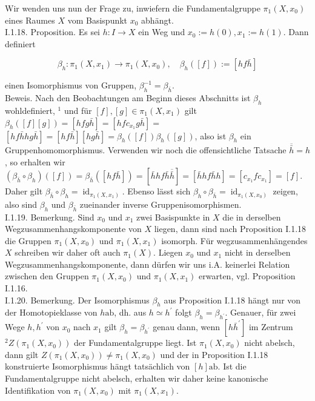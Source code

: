 \documentclass[10pt]{article}
\begin{document}
Wir wenden uns nun der Frage zu, inwiefern die Fundamentalgruppe $\pi_{1}\left(X, x_{0}\right)$ eines Raumes $X$ vom Basispunkt $x_{0}$ abhängt.\\
I.1.18. Proposition. Es sei $h: I \rightarrow X$ ein Weg und $x_{0}:=h(0), x_{1}:=h(1)$. Dann definiert

$$
\beta_{h}: \pi_{1}\left(X, x_{1}\right) \rightarrow \pi_{1}\left(X, x_{0}\right), \quad \beta_{h}([f]):=[h f \bar{h}]
$$

einen Isomorphismus von Gruppen, $\beta_{h}^{-1}=\beta_{\bar{h}}$.\\
Beweis. Nach den Beobachtungen am Beginn dieses Abschnitts ist $\beta_{h}$ wohldefiniert, ${ }^{1}$ und für $[f],[g] \in \pi_{1}\left(X, x_{1}\right)$ gilt $\beta_{h}([f][g])=[h f g \bar{h}]=\left[h f c_{x_{1}} g \bar{h}\right]=$ $[h f \bar{h} h g \bar{h}]=[h f \bar{h}][h g \bar{h}]=\beta_{h}([f]) \beta_{h}([g])$, also ist $\beta_{h}$ ein Gruppenhomomorphismus. Verwenden wir noch die offensichtliche Tatsache $\overline{\bar{h}}=h$, so erhalten wir $\left(\beta_{\bar{h}} \circ \beta_{h}\right)([f])=\beta_{\bar{h}}([h f \bar{h}])=[\bar{h} h f \bar{h} \overline{\bar{h}}]=[\bar{h} h f \bar{h} h]=\left[c_{x_{1}} f c_{x_{1}}\right]=[f]$. Daher gilt $\beta_{\bar{h}} \circ \beta_{h}=\operatorname{id}_{\pi_{1}\left(X, x_{1}\right)}$. Ebenso lässt sich $\beta_{h} \circ \beta_{\bar{h}}=\operatorname{id}_{\pi_{1}\left(X, x_{0}\right)}$ zeigen, also sind $\beta_{h}$ und $\beta_{\bar{h}}$ zueinander inverse Gruppenisomorphismen.\\
I.1.19. Bemerkung. Sind $x_{0}$ und $x_{1}$ zwei Basispunkte in $X$ die in derselben Wegzusammenhangskomponente von $X$ liegen, dann sind nach Proposition I.1.18 die Gruppen $\pi_{1}\left(X, x_{0}\right)$ und $\pi_{1}\left(X, x_{1}\right)$ isomorph. Für wegzusammenhängendes $X$ schreiben wir daher oft auch $\pi_{1}(X)$. Liegen $x_{0}$ und $x_{1}$ nicht in derselben Wegzusammenhangskomponente, dann dürfen wir uns i.A. keinerlei Relation zwischen den Gruppen $\pi_{1}\left(X, x_{0}\right)$ und $\pi_{1}\left(X, x_{1}\right)$ erwarten, vgl. Proposition I.1.16.\\
I.1.20. Bemerkung. Der Isomorphismus $\beta_{h}$ aus Proposition I.1.18 hängt nur von der Homotopieklasse von $h \mathrm{ab}$, dh. aus $h \simeq h^{\prime}$ folgt $\beta_{h}=\beta_{h^{\prime}}$. Genauer, für zwei Wege $h, h^{\prime}$ von $x_{0}$ nach $x_{1}$ gilt $\beta_{h}=\beta_{h^{\prime}}$ genau dann, wenn $\left[h \bar{h}^{\prime}\right]$ im Zentrum ${ }^{2} Z\left(\pi_{1}\left(X, x_{0}\right)\right)$ der Fundamentalgruppe liegt. Ist $\pi_{1}\left(X, x_{0}\right)$ nicht abelsch, dann gilt $Z\left(\pi_{1}\left(X, x_{0}\right)\right) \neq \pi_{1}\left(X, x_{0}\right)$ und der in Proposition I.1.18 konstruierte Isomorphismus hängt tatsächlich von $[h] \mathrm{ab}$. Ist die Fundamentalgruppe nicht abelsch, erhalten wir daher keine kanonische Identifikation von $\pi_{1}\left(X, x_{0}\right)$ mit $\pi_{1}\left(X, x_{1}\right)$.\\
\end{document}
